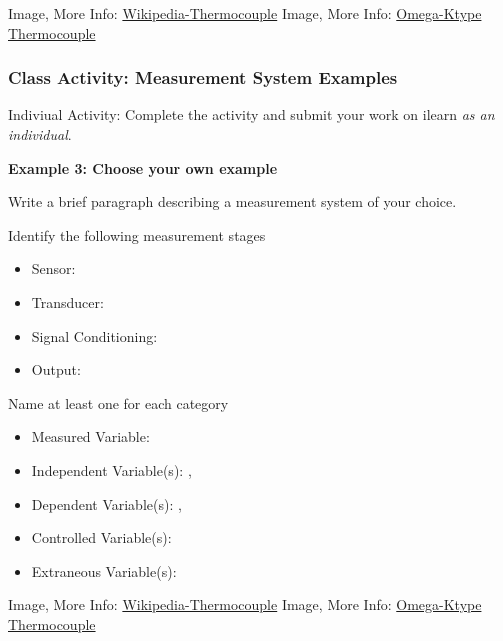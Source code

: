 \documentclass[fleqn]{beamer} %
\newcommand{\sectionIIsubsectionVtitle}{Class Activity: Measurement System Examples}
\begin{document}
\begin{frame}
\begin{multicols}{2}
				\end{multicols}	

				{\tiny Image, More Info: \href{https://en.wikipedia.org/wiki/Thermocouple}{Wikipedia-Thermocouple} }
				{\tiny Image, More Info: \href{https://www.omega.com/en-us/resources/k-type-thermocouples}{Omega-Ktype Thermocouple} }\hspace{40mm} 

			\end{frame}

			\begin{frame}
				\frametitle{\sectionIIsubsectionVtitle}
				\tiny

				Indiviual Activity: Complete the activity and submit your work on ilearn {\it as an individual}.	

				\begin{multicols}{2}

				\textbf{Example 3: Choose your own example} \vspc
				
				Write a brief paragraph describing a measurement system of your choice. 

				Identify the following measurement stages 
				\begin{itemize}
				\item Sensor: \hspcu
				\item Transducer: \hspcu
				\item Signal Conditioning: \hspcu
				\item Output: \hspcu
				\end{itemize}


				Name at least one for each category 

				\begin{itemize}
				\item Measured Variable: \hspcu \vspc 
				\item Independent Variable(s): \hspcu, \hspcu \vspc
				\item Dependent Variable(s): \hspcu, \hspcu \vspc 
				\item Controlled Variable(s): \hspcu \vspc 
				\item Extraneous Variable(s):\hspcu \vspc
				\end{itemize}

				\end{multicols}	

				{\tiny Image, More Info: \href{https://en.wikipedia.org/wiki/Thermocouple}{Wikipedia-Thermocouple} }
				{\tiny Image, More Info: \href{https://www.omega.com/en-us/resources/k-type-thermocouples}{Omega-Ktype Thermocouple} }\hspace{40mm} 

			\end{frame}
\end{document}
